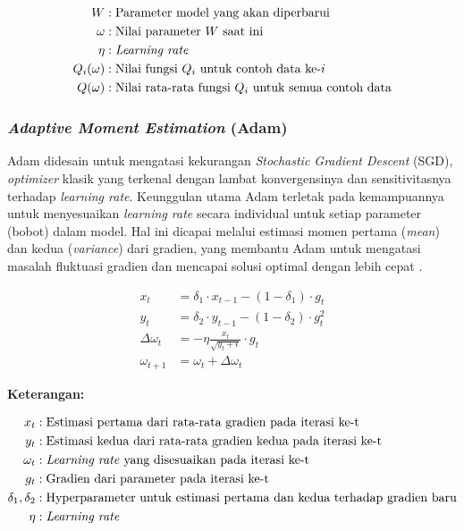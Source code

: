      \begin{align*}
    W & : \text{Parameter model yang akan diperbarui} \\
    \omega & : \text{Nilai parameter } W \text{ saat ini} \\
    \eta & : \text{\textit{Learning rate}} \\
    Q_i(\omega) & : \text{Nilai fungsi } Q_i \text{ untuk contoh data ke-}i \\
    Q(\omega) & : \text{Nilai rata-rata fungsi } Q_i \text{ untuk semua contoh data}
\end{align*}


    

\subsubsection{\textit{Adaptive Moment Estimation} (Adam)}
Adam didesain untuk mengatasi kekurangan \textit{Stochastic Gradient Descent} (SGD), \textit{optimizer} klasik yang terkenal dengan lambat konvergensinya dan sensitivitasnya terhadap \textit{learning rate}.  Keunggulan utama Adam terletak pada kemampuannya untuk menyesuaikan \textit{learning rate} secara individual untuk setiap parameter (bobot) dalam model.  Hal ini dicapai melalui estimasi momen pertama (\textit{mean}) dan kedua (\textit{variance}) dari gradien, yang membantu Adam untuk mengatasi masalah fluktuasi gradien dan mencapai solusi optimal dengan lebih cepat \cite{miranda2020convolutional}.

    \begin{equation}
    \begin{aligned}
        x_t &= \delta_1 \cdot x_{t-1} - (1 - \delta_1) \cdot g_t \\
        y_t &= \delta_2 \cdot y_{t-1} - (1 - \delta_2) \cdot g_t^2 \\
        \Delta \omega_t &= -\eta \frac{x_t}{\sqrt{y_t + \epsilon}} \cdot g_t \\
        \omega_{t+1} &= \omega_t + \Delta \omega_t
    \end{aligned}
    \label{Adam}
    \end{equation}

 \textbf{Keterangan:}

    \begin{align*}
    x_t &: \text{Estimasi pertama dari rata-rata gradien pada iterasi ke-t}\\
    y_t &: \text{Estimasi kedua dari rata-rata gradien kedua pada iterasi ke-t}\\
    \omega_t &: \text{\textit{Learning rate} yang disesuaikan pada iterasi ke-t}\\
    g_t &: \text{Gradien dari parameter pada iterasi ke-t}\\
    \delta_1, \delta_2 &: \text{Hyperparameter untuk estimasi pertama dan kedua terhadap gradien baru}\\
    \eta &: \text{\textit{Learning rate}}\\
\end{align*}





